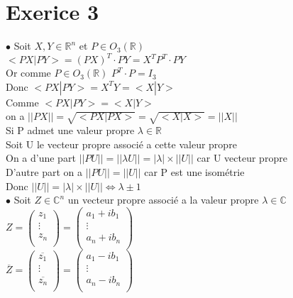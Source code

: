 \documentclass{article}
\author{Frederic Becerril}
\begin{document}
\part*{Exerice 3}

$\bullet$ Soit $X, Y \in \mathbb{R}^n$ et $P \in O_3(\mathbb{R})$\\
$<PX | PY> = (PX)^T \cdot PY = X^T P^T \cdot P Y$\\
Or comme $P \in O_3(\mathbb{R})$ $P^T \cdot P = I_3$\\
Donc $<PX | PY> = X^T Y = <X|Y>$\\
Comme $<PX | PY> = <X|Y>$\\
on a $||PX|| = \sqrt{<PX|PX>} = \sqrt{<X|X>} = ||X||$\\
Si P admet une valeur propre $\lambda \in \mathbb{R}$\\
Soit U le vecteur propre associé a cette valeur propre\\
On a d'une part $||PU|| = ||\lambda U|| = |\lambda| \times ||U||$ car U vecteur propre\\
D'autre part on a $||PU|| = ||U||$ car P est une isométrie\\
Donc $||U|| = |\lambda| \times ||U|| \Leftrightarrow \lambda \pm 1$\\
$\bullet$ Soit $Z \in \mathbb{C}^n$ un vecteur propre associé a la valeur propre $\lambda \in \mathbb{C}$\\
$Z = \begin{pmatrix}
    z_1\\
    \vdots\\
    z_n\\
\end{pmatrix} = \begin{pmatrix}
    a_1 + i b_1\\
    \vdots\\
    a_n + i b_n\\
\end{pmatrix}$ \\
$\overline{Z} = \begin{pmatrix}
    \overline{z_1}\\
    \vdots\\
    \overline{z_n}\\
\end{pmatrix} = \begin{pmatrix}
    a_1 - i b_1\\
    \vdots\\
    a_n - i b_n\\
\end{pmatrix}$ \\
\end{document}
